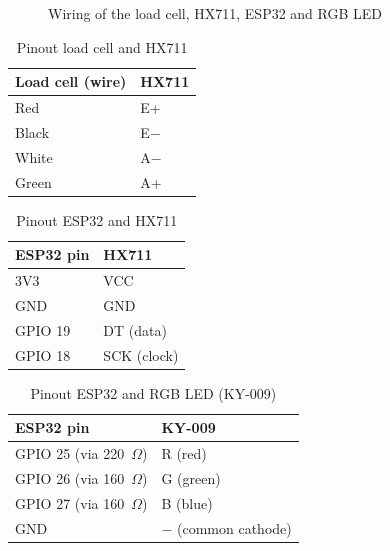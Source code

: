 \begin{figure}[H]
{
  }
  \caption{Wiring of the load cell, HX711, ESP32 and RGB LED}
  \label{fig:wiring}
\end{figure}

\begin{table}[H]
	\centering
	\begin{tabular}{|l|l|}
		\hline
		Load cell (wire) & HX711 \\
		\hline
		Red & E+ \\
		Black & E$-$ \\
		White & A$-$ \\
		Green & A+ \\
		\hline
	\end{tabular}
	\caption{Pinout load cell and HX711}
	\label{tab:pinout-loadcell}
\end{table}

\begin{table}[H]
	\centering
	\begin{tabular}{|l|l|}
		\hline
		ESP32 pin & HX711 \\
		\hline
		3V3 & VCC \\
		GND & GND \\
		GPIO 19 & DT (data) \\
		GPIO 18 & SCK (clock) \\
		\hline
	\end{tabular}
	\caption{Pinout ESP32 and HX711}
	\label{tab:pinout-hx711}
\end{table}

\begin{table}[H]
	\centering
	\begin{tabular}{|l|l|}
		\hline
		ESP32 pin & KY-009 \\
		\hline
		GPIO 25 (via 220~$\Omega$) & R (red) \\
		GPIO 26 (via 160~$\Omega$) & G (green) \\
		GPIO 27 (via 160~$\Omega$) & B (blue) \\
		GND & $-$ (common cathode) \\
		\hline
	\end{tabular}
	\caption{Pinout ESP32 and RGB LED (KY-009)}
	\label{tab:pinout-led}
\end{table}